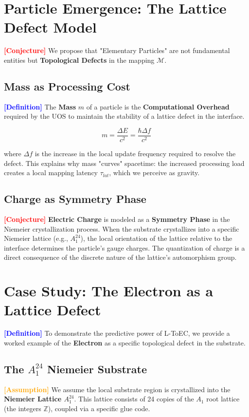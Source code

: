 \documentclass[11pt,titlepage]{article}
\newcommand{\tagdef}{\textcolor{blue}{\textbf{[Definition]}} }
\newcommand{\tagass}{\textcolor{orange}{\textbf{[Assumption]}} }
\newcommand{\tagconj}{\textcolor{red}{\textbf{[Conjecture]}} }
\begin{document}
\section{Particle Emergence: The Lattice Defect Model}
\label{sec:particles}
\tagconj We propose that "Elementary Particles" are not fundamental entities but \textbf{Topological Defects} in the mapping $\mathcal{M}$.

\subsection{Mass as Processing Cost}
\tagdef The \textbf{Mass} $m$ of a particle is the \textbf{Computational Overhead} required by the UOS to maintain the stability of a lattice defect in the interface. 

\begin{equation}
m = \frac{\Delta E}{c^2} = \frac{\hbar \Delta f}{c^2}
\end{equation}

where $\Delta f$ is the increase in the local update frequency required to resolve the defect. This explains why mass "curves" spacetime: the increased processing load creates a local mapping latency $\tau_{lat}$, which we perceive as gravity.

\subsection{Charge as Symmetry Phase}
\tagconj \textbf{Electric Charge} is modeled as a \textbf{Symmetry Phase} in the Niemeier crystallization process. When the substrate crystallizes into a specific Niemeier lattice (e.g., $A_1^{24}$), the local orientation of the lattice relative to the interface determines the particle's gauge charges. The quantization of charge is a direct consequence of the discrete nature of the lattice's automorphism group.

\section{Case Study: The Electron as a Lattice Defect}
\label{sec:electron_case_study}
\tagdef To demonstrate the predictive power of L-ToEC, we provide a worked example of the \textbf{Electron} as a specific topological defect in the substrate.

\subsection{The $A_1^{24}$ Niemeier Substrate}
\tagass We assume the local substrate region is crystallized into the \textbf{Niemeier Lattice $A_1^{24}$}. This lattice consists of 24 copies of the $A_1$ root lattice (the integers $\mathbb{Z}$), coupled via a specific glue code.
\end{document}
